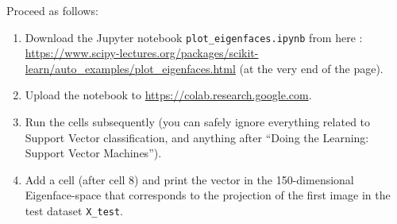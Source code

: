 \documentclass[10pt]{article}
\begin{document}
Proceed as follows:
\begin{enumerate}
\item Download the Jupyter notebook \texttt{plot\_eigenfaces.ipynb} from here : \url{https://www.scipy-lectures.org/packages/scikit-learn/auto_examples/plot_eigenfaces.html} (at the very end of the page).
\item Upload the notebook to \url{https://colab.research.google.com}.
\item Run the cells subsequently (you can safely ignore everything related to Support Vector classification, and anything after ``Doing the Learning: Support Vector Machines'').
  \item Add a cell (after cell 8) and print the vector in the 150-dimensional Eigenface-space that corresponds to the projection of the first image in the test dataset \texttt{X\_test}.
\end{enumerate}
\end{document}
